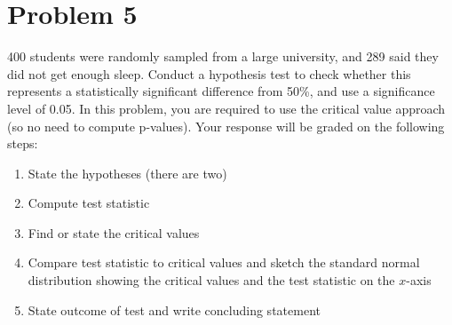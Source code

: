 \documentclass[11pt,twoside]{article}
\newcommand{\pts}[1]{\marginpar{ \small\hspace{0pt} \textit{[#1]} } }
\newcommand{\?}{\stackrel{?}{=}}
\begin{document}
 \section*{Problem 5       }
 400 students were randomly sampled from a large university, and 289 said they did not get enough sleep. Conduct a hypothesis test to check whether this represents a statistically significant difference from 50\%, and use a significance level of 0.05.
 In this problem, you are required to use the critical value approach (so no need to compute p-values). Your response will be graded on the following steps:
 \begin{enumerate}[\bf (a)]
  \item State the hypotheses (there are two) \pts{2}
    \vspace{10ex}
  \item Compute test statistic \pts{2}
      \vspace{20ex}

  \item Find or state the critical values \pts{2}
      \vspace{15ex}

  \item Compare test statistic to critical values and sketch the standard normal distribution showing the critical values and the test statistic on the $x$-axis \pts{4}
      \vspace{25ex}

  \item State outcome of test and write concluding statement \pts{2}
 \end{enumerate}


 \eject 
\end{document}
